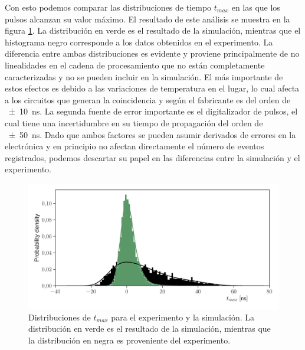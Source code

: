 Con esto podemos comparar las distribuciones de tiempo $t_{max}$ en las que los pulsos alcanzan su valor máximo. El resultado de este análisis se muestra en la figura \ref{fig:tmax}. La distribución en verde es el resultado de la simulación, mientras que el histograma negro corresponde a los datos obtenidos en el experimento. La diferencia entre ambas distribuciones es evidente y proviene principalmente de no linealidades en el cadena de procesamiento que no están completamente caracterizadas y no se pueden incluir en la simulación. El más importante de estos efectos es debido a las variaciones de temperatura en el lugar, lo cual afecta a los circuitos que generan la coincidencia y según el fabricante es del orden de \SI{\pm 10}{\ns}. La segunda fuente de error importante es el digitalizador de pulsos, el cual tiene una incertidumbre en su tiempo de propagación del orden de \SI{\pm 50}{\ns}. Dado que ambos factores se pueden asumir derivados de errores en la electrónica y en principio no afectan directamente el número de eventos registrados, podemos descartar su papel en las diferencias entre la simulación y el experimento.

\begin{figure}
        \centering
        \includegraphics[width=\textwidth]{tmax_dist.pdf}
        \caption{Distribuciones de $t_{max}$ para el experimento y la simulación. La distribución en verde es el resultado de la simulación, mientras que la distribución en negra es proveniente del experimento.}
        \label{fig:tmax}
\end{figure}

